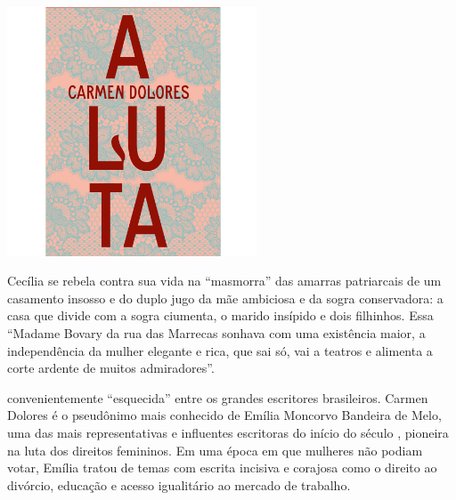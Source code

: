 \pagebreak %


\begin{center}
\hspace*{-3.6cm}
\hspace*{3.1cm}\includegraphics[width=74mm]{./grid/luta.jpg}
\end{center}

\hspace*{-7cm}\hrulefill\hspace*{-7cm}

\medskip

\noindent{}Cecília se rebela contra sua vida na “masmorra” das amarras patriarcais de um casamento insosso e do duplo jugo da mãe ambiciosa e da sogra conservadora: a casa que divide com a sogra ciumenta, o marido insípido e dois filhinhos. Essa “Madame Bovary da rua das Marrecas sonhava com uma existência maior, a independência da mulher elegante e rica, que sai só, vai a teatros e alimenta a corte ardente de muitos admiradores”.

 convenientemente “esquecida” entre os grandes escritores brasileiros. Carmen Dolores é o pseudônimo mais conhecido de Emília Moncorvo Bandeira de Melo, uma das mais representativas e influentes escritoras do início do século , pioneira na luta dos direitos femininos. Em uma época em que mulheres não podiam votar, Emília tratou de temas com escrita incisiva e corajosa como o direito ao divórcio, educação e acesso igualitário ao mercado de trabalho. 


\vfill

